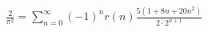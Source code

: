 \documentclass[preview]{standalone}
\begin{document}
\begin{align*}
\frac{2}{\pi^2} = \sum_{n=0}^{\infty} (-1)^n r(n) \frac{5(1 + 8n + 20n^2)}{2 \cdot 2^{n+1}}
\end{align*}
\end{document}
